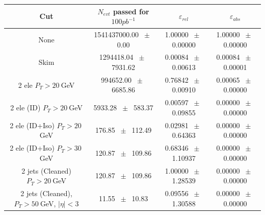 \begin{table}[htbp] 
\begin{center} 
\begin{tabular}{|c|c|c|c|} 
\hline\hline 
 Cut & $N_{evt}$ passed for $100pb^{-1}$ & $\varepsilon_{rel}$ & $\varepsilon_{abs}$ \\ 
\hline\hline 
None          &           1541437000.00          $~\pm~$          0.00           &           1.00000          $~\pm~$          0.00000           &           1.00000          $~\pm~$          0.00000          \\          
          Skim          &           1294418.04          $~\pm~$          7931.62           &           0.00084          $~\pm~$          0.00613           &           0.00084          $~\pm~$          0.00001          \\          
          2 ele $P_T>20~$GeV          &           994652.00          $~\pm~$          6685.86           &           0.76842          $~\pm~$          0.00910           &           0.00065          $~\pm~$          0.00000          \\          
          2 ele (ID) $P_T>20~$GeV          &           5933.28          $~\pm~$          583.37           &           0.00597          $~\pm~$          0.09855           &           0.00000          $~\pm~$          0.00000          \\          
          2 ele (ID+Iso) $P_T>20~$GeV          &           176.85          $~\pm~$          112.49           &           0.02981          $~\pm~$          0.64363           &           0.00000          $~\pm~$          0.00000          \\          
          2 ele (ID+Iso) $P_T>30~$GeV          &           120.87          $~\pm~$          109.86           &           0.68346          $~\pm~$          1.10937           &           0.00000          $~\pm~$          0.00000          \\          
          2 jets (Cleaned) $P_T>20~$GeV          &           120.87          $~\pm~$          109.86           &           1.00000          $~\pm~$          1.28539           &           0.00000          $~\pm~$          0.00000          \\          
          2 jets (Cleaned), $P_T>50~$GeV, $ | \eta |<3$          &           11.55          $~\pm~$          10.83           &           0.09556          $~\pm~$          1.30588           &           0.00000          $~\pm~$          0.00000          \\          

\end{tabular}
\end{center}
\end{table}
